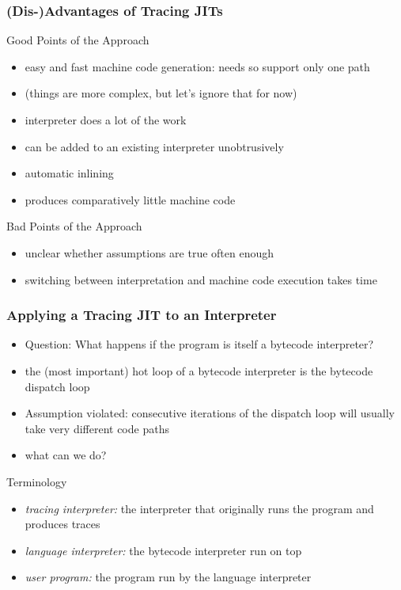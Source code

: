\documentclass[utf8x]{beamer}
\begin{document}
\begin{frame}
    \frametitle{(Dis-)Advantages of Tracing JITs}
    \begin{block}{Good Points of the Approach}
        \begin{itemize}
        \item easy and fast machine code generation: needs so support only one path
        \item (things are more complex, but let's ignore that for now)
        \item interpreter does a lot of the work
        \item can be added to an existing interpreter unobtrusively
        \item automatic inlining
        \item produces comparatively little machine code
        \end{itemize}
    \end{block}
    \pause
    \begin{block}{Bad Points of the Approach}
        \begin{itemize}
        \item unclear whether assumptions are true often enough
        \item switching between interpretation and machine code execution takes time
        \end{itemize}
    \end{block}
\end{frame}

\begin{frame}
    \frametitle{Applying a Tracing JIT to an Interpreter}
    \begin{itemize}
    \item Question: What happens if the program is itself a bytecode interpreter?
    \item the (most important) hot loop of a bytecode interpreter is the bytecode dispatch loop
    \item Assumption violated: consecutive iterations of the dispatch loop will usually take very different code paths
    \item what can we do?
    \end{itemize}
    \pause
    \begin{block}{Terminology}
        \begin{itemize}
        \item \emph{tracing interpreter:} the interpreter that originally runs the program and produces traces
        \item \emph{language interpreter:} the bytecode interpreter run on top
        \item \emph{user program:} the program run by the language interpreter
        \end{itemize}
    \end{block}
\end{frame}
\end{document}
